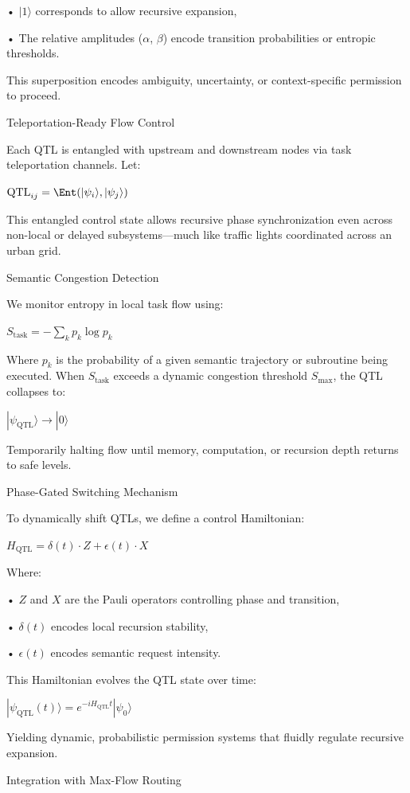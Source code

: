 \documentclass[11pt]{article}
\begin{document}
• $|1\rangle$ corresponds to allow recursive expansion,

• The relative amplitudes ($\alpha$, $\beta$) encode transition probabilities or entropic thresholds.

This superposition encodes ambiguity, uncertainty, or context-specific permission to proceed.

Teleportation-Ready Flow Control

Each QTL is entangled with upstream and downstream nodes via task teleportation channels. Let:

$\text{QTL}_{ij} = \Ent(|\psi_i\rangle, |\psi_j\rangle)$

This entangled control state allows recursive phase synchronization even across non-local or delayed subsystems—much like traffic lights coordinated across an urban grid.

Semantic Congestion Detection

We monitor entropy in local task flow using:

$S_{\text{task}} = - \sum_k p_k \log p_k$

Where $p_k$ is the probability of a given semantic trajectory or subroutine being executed. When $S_{\text{task}}$ exceeds a dynamic congestion threshold $S_{\max}$, the QTL collapses to:

$|\psi_{\text{QTL}}\rangle \to |0\rangle$

Temporarily halting flow until memory, computation, or recursion depth returns to safe levels.

Phase-Gated Switching Mechanism

To dynamically shift QTLs, we define a control Hamiltonian:

$H_{\text{QTL}} = \delta(t) \cdot Z + \epsilon(t) \cdot X$

Where:

• $Z$ and $X$ are the Pauli operators controlling phase and transition,

• $\delta(t)$ encodes local recursion stability,

• $\epsilon(t)$ encodes semantic request intensity.

This Hamiltonian evolves the QTL state over time:

$|\psi_{\text{QTL}}(t)\rangle = e^{-i H_{\text{QTL}} t} |\psi_0\rangle$

Yielding dynamic, probabilistic permission systems that fluidly regulate recursive expansion.

Integration with Max-Flow Routing
\end{document}
